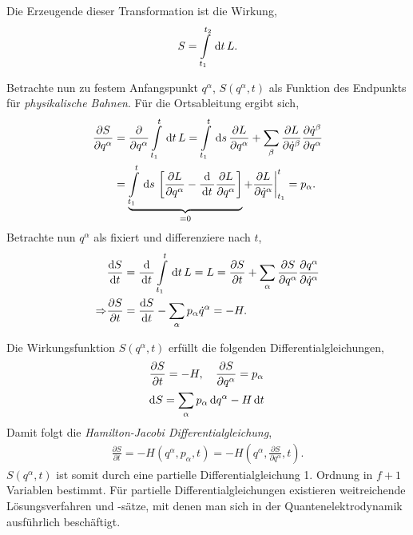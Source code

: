 Die Erzeugende dieser Transformation ist die Wirkung,
\begin{align*}
S = \int\limits_{t_1}^{t_2}\,\mathrm{d} t\, L.
\end{align*}

Betrachte nun zu festem Anfangspunkt $q^\alpha$, $S(q^\alpha,t)$ als Funktion
des Endpunkts für \textit{physikalische Bahnen}. Für die Ortsableitung ergibt
sich,
\begin{align*}
\frac{\partial S}{\partial q^\alpha} &= \frac{\partial}{\partial
q^\alpha}\int\limits_{t_1}^{t} \,\mathrm{d} t\, L = 
\int\limits_{t_1}^t \,\mathrm{d} s\, \frac{\partial L}{\partial q^\alpha}
+ \sum_\beta \frac{\partial L}{\partial \dot{q}^\beta}\frac{\partial
\dot{q}^\beta}{\partial q^\alpha}
\\ &= \underbrace{\int\limits_{t_1}^t \,\mathrm{d} s\, \left[\frac{\partial L}{\partial
q^\alpha} - \frac{\mathrm{d}}{\,\mathrm{d} t\,}\frac{\partial L}{\partial q^\alpha}\right]}_{=0}
+ \frac{\partial L}{\partial \dot{q}^\alpha}\bigg|_{t_1}^t = p_\alpha.
\end{align*}
Betrachte nun $q^\alpha$ als fixiert und differenziere nach $t$,
\begin{align*}
&\frac{\mathrm{d} S}{\,\mathrm{d} t\,} =\frac{\mathrm{d} }{\,\mathrm{d} t\,}\int\limits_{t_1}^t \,\mathrm{d} t\, L = L
= \frac{\partial S}{\partial t} + \sum_\alpha \frac{\partial S}{\partial
q^\alpha}\frac{\partial q^\alpha}{\partial \dot{q}^\alpha}\\
\Rightarrow & \frac{\partial S}{\partial t} = \frac{\mathrm{d} S}{\,\mathrm{d} t\,} -
\sum_\alpha p_\alpha\dot{q}^\alpha =- H.
\end{align*}

Die Wirkungsfunktion $S(q^\alpha,t)$ erfüllt die folgenden
Differentialgleichungen,
\begin{align*}
&\frac{\partial S}{\partial t} = -H, \quad
\frac{\partial S}{\partial q^\alpha} = p_\alpha\\
&\mathrm{d} S = \sum_\alpha p_\alpha \,\mathrm{d} q^\alpha - H\,\mathrm{d} t\,
\end{align*}
Damit folgt die \emph{Hamilton-Jacobi Differentialgleichung},
\begin{align*}
\frac{\partial S}{\partial t} = -H(q^\alpha,p_\alpha,t) =
-H(q^\alpha,\frac{\partial S}{\partial q^\alpha},t).
\end{align*}
$S(q^\alpha,t)$ ist somit durch eine partielle Differentialgleichung 1. Ordnung
in $f+1$ Variablen bestimmt. Für partielle Differentialgleichungen existieren
weitreichende Lösungsverfahren und -sätze, mit denen man sich in der
Quantenelektrodynamik ausführlich beschäftigt.

